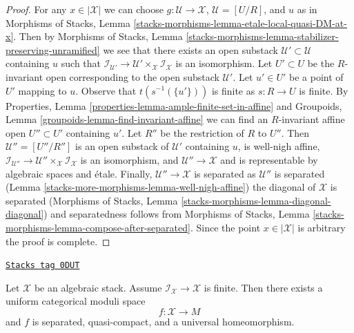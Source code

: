 \begin{proof}
For any $x \in |\mathcal{X}|$ we can choose
$g : \mathcal{U} \to \mathcal{X}$, $\mathcal{U} = [U/R]$, and $u$ as in
Morphisms of Stacks,
Lemma \ref{stacks-morphisms-lemma-etale-local-quasi-DM-at-x}.
Then by
Morphisms of Stacks, Lemma
\ref{stacks-morphisms-lemma-stabilizer-preserving-unramified}
we see that there exists an open substack
$\mathcal{U}' \subset \mathcal{U}$ containing $u$
such that $\mathcal{I}_{\mathcal{U}'} \to
\mathcal{U}' \times_\mathcal{X} \mathcal{I}_\mathcal{X}$
is an isomorphism.
Let $U' \subset U$ be the $R$-invariant open corresponding to
the open substack $\mathcal{U}'$.
Let $u' \in U'$ be a point of $U'$ mapping to $u$.
Observe that $t(s^{-1}(\{u'\}))$ is finite as $s : R \to U$ is finite.
By Properties, Lemma \ref{properties-lemma-ample-finite-set-in-affine}
and Groupoids, Lemma \ref{groupoids-lemma-find-invariant-affine}
we can find an $R$-invariant affine open $U'' \subset U'$
containing $u'$. Let $R''$ be the restriction of $R$ to $U''$.
Then $\mathcal{U}'' = [U''/R'']$ is an open substack of
$\mathcal{U}'$ containing $u$, is well-nigh affine,
$\mathcal{I}_{\mathcal{U}''} \to
\mathcal{U}'' \times_\mathcal{X} \mathcal{I}_\mathcal{X}$
is an isomorphism, and $\mathcal{U}'' \to \mathcal{X}$
and is representable by algebraic spaces and \'etale.
Finally, $\mathcal{U}'' \to \mathcal{X}$ is separated as
$\mathcal{U}''$ is separated (Lemma \ref{stacks-more-morphisms-lemma-well-nigh-affine})
the diagonal of $\mathcal{X}$ is separated
(Morphisms of Stacks, Lemma \ref{stacks-morphisms-lemma-diagonal-diagonal})
and separatedness follows from Morphisms of Stacks, Lemma
\ref{stacks-morphisms-lemma-compose-after-separated}.
Since the point $x \in |\mathcal{X}|$ is arbitrary the proof is complete.
\end{proof}

\begin{theorem}

\label{stacks-more-morphisms-theorem-keel-mori}
\href{https://stacks.math.columbia.edu/tag/0DUT}{\texttt{Stacks tag 0DUT}}

Let $\mathcal{X}$ be an algebraic stack. Assume
$\mathcal{I}_\mathcal{X} \to \mathcal{X}$ is finite.
Then there exists a uniform categorical moduli space
$$
f : \mathcal{X} \longrightarrow M
$$
and $f$ is separated, quasi-compact, and a universal homeomorphism.
\end{theorem}

